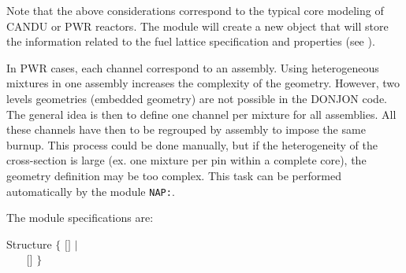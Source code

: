 \noindent
Note that the above considerations correspond to the typical core modeling
of CANDU or PWR reactors. The  module will create a new 
object that will store the information related to the fuel lattice specification and
properties (see ).

\noindent
In PWR cases, each channel correspond to an assembly. Using heterogeneous mixtures in one assembly increases the complexity of the geometry. However, two levels geometries (embedded geometry) are not possible in the DONJON code. The general idea is then to define one channel per mixture for all assemblies. All these channels have then to be regrouped by assembly to impose the same burnup. This process could be done manually, but if the heterogeneity of the cross-section is large (ex. one mixture per pin within a complete core), the geometry definition may be too complex. This task can be performed automatically by the module {\tt NAP:}. 

\noindent
The  module specifications are:

\begin{DataStructure}{Structure }
$\{$   \moc{:=}
  $[$$]$ \moc{::}  $|$ \\
~~~ \moc{:=}   $[$$]$
\moc{::}  $\}$\\
\end{DataStructure}

